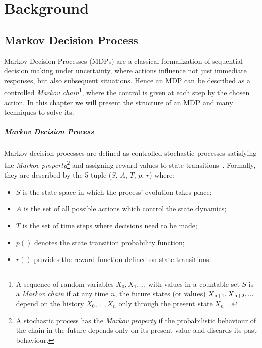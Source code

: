 \chapter{Background}

\section{Markov Decision Process}

Markov Decision Processes (MDPs) are a classical formalization of sequential decision making under uncertainty, where actions influence not just immediate responses, but also subsequent situations. Hence an MDP can be described as a controlled \textit{Markov chain}\footnote{A sequence of random variables $X_0, X_1, . . .$ with values in a countable set $S$ is a \textit{Markov chain} if at any time $n$, the future states (or values) $X\textsubscript{n+1}, X\textsubscript{n+2}, . . .$ depend on the history $X_0, . . . , X_n$ only through the present state $X_n$~\cite{konstantopoulos2009markov} .}, where the control is given at each step by the chosen action. In this chapter we will present the structure of an MDP and many techniques to solve its.

\paragraph{Markov Decision Process} Markov decision processes are defined as controlled stochastic processes satisfying the \textit{Markov property}\footnote{A stochastic process has the \textit{Markov property} if the probabilistic behaviour of the chain in the future depends only on its present value and discards its past behaviour.} and assigning reward values to state transitions~\cite{Put94}.  Formally, they are described by the 5-tuple ($S$, $A$, $T$, $p$, $r$) where:

\begin{itemize}
	\item $S$ is the state space in which the process’ evolution takes place;
	\item $A$ is the set of all possible actions which control the state dynamics;
	\item $T$ is the set of time steps where decisions need to be made;
	\item $p()$ denotes the state transition probability function;
	\item $r()$ provides the reward function defined on state transitions.	
\end{itemize}

